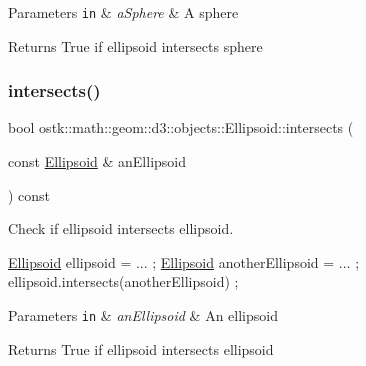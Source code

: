 \begin{DoxyParams}[1]{Parameters}
\mbox{\tt in}  & {\em a\+Sphere} & A sphere \\
\hline
\end{DoxyParams}
\begin{DoxyReturn}{Returns}
True if ellipsoid intersects sphere 
\end{DoxyReturn}
\mbox{\label{classostk_1_1math_1_1geom_1_1d3_1_1objects_1_1_ellipsoid_a2e886a6b074d7feada943ebc60f3d873}} 
\subsubsection{\texorpdfstring{intersects()}{intersects()}\hspace{0.1cm}{\footnotesize\ttfamily [8/10]}}
{\footnotesize\ttfamily bool ostk\+::math\+::geom\+::d3\+::objects\+::\+Ellipsoid\+::intersects (\begin{DoxyParamCaption}\item[{const \hyperlink{classostk_1_1math_1_1geom_1_1d3_1_1objects_1_1_ellipsoid}{Ellipsoid} \&}]{an\+Ellipsoid }\end{DoxyParamCaption}) const}



Check if ellipsoid intersects ellipsoid. 


\begin{DoxyCode}
\hyperlink{classostk_1_1math_1_1geom_1_1d3_1_1objects_1_1_ellipsoid_acd84276f65a14db12623402a411712b7}{Ellipsoid} ellipsoid = ... ;
\hyperlink{classostk_1_1math_1_1geom_1_1d3_1_1objects_1_1_ellipsoid_acd84276f65a14db12623402a411712b7}{Ellipsoid} anotherEllipsoid = ... ;
ellipsoid.intersects(anotherEllipsoid) ;
\end{DoxyCode}



\begin{DoxyParams}[1]{Parameters}
\mbox{\tt in}  & {\em an\+Ellipsoid} & An ellipsoid \\
\hline
\end{DoxyParams}
\begin{DoxyReturn}{Returns}
True if ellipsoid intersects ellipsoid 
\end{DoxyReturn}
\mbox{\label{classostk_1_1math_1_1geom_1_1d3_1_1objects_1_1_ellipsoid_a52ec9908e019762565ea341577b82944}} 
